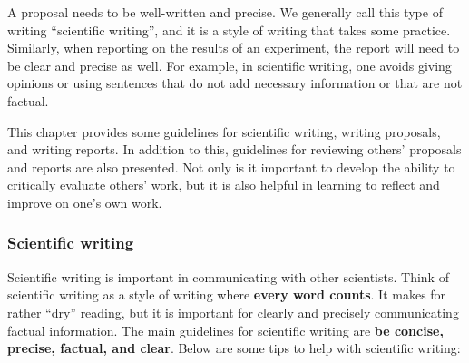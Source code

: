 A proposal needs to be well-written and precise. We generally call this type of writing ``scientific writing'', and it is a style of writing that takes some practice. Similarly, when reporting on the results of an experiment, the report will need to be clear and precise as well. For example, in scientific writing, one avoids giving opinions or using sentences that do not add necessary information or that are not factual.

This chapter provides some guidelines for scientific writing, writing proposals, and writing reports. In addition to this, guidelines for reviewing others' proposals and reports are also presented. Not only is it important to develop the ability to critically evaluate others' work, but it is also helpful in learning to reflect and improve on one's own work.

\subsubsection{Scientific writing}

Scientific writing is important in communicating with other scientists. Think of scientific writing as a style of writing where \textbf{every word counts}. It makes for rather ``dry'' reading, but it is important for clearly and precisely communicating factual information. The main guidelines for scientific writing are \textbf{be concise, precise, factual, and clear}. Below are some tips to help with scientific writing:

